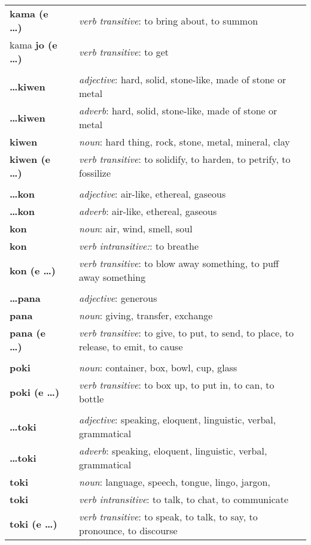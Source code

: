 \begin{supertabular}{p{2,5cm}|ll}
\textbf{kama (e \dots)} && \textit{verb transitive}: to bring about, to summon \\ %
kama \textbf{jo (e \dots)} && \textit{verb transitive}: to get \\ %
 && \\ %
\textbf{\dots kiwen} && \textit{adjective}: hard, solid, stone-like, made of stone or metal \\ %
\textbf{\dots kiwen} && \textit{adverb}: hard, solid, stone-like, made of stone or metal \\ %
\textbf{kiwen} && \textit{noun}: hard thing, rock, stone, metal, mineral, clay \\ %
\textbf{kiwen (e \dots)} && \textit{verb transitive}: to solidify, to harden, to petrify, to fossilize \\ %
 && \\ %
\textbf{\dots kon} && \textit{adjective}: air-like, ethereal, gaseous \\ %
\textbf{\dots kon} && \textit{adverb}: air-like, ethereal, gaseous \\ %
\textbf{kon} && \textit{noun}: air, wind, smell, soul \\ %
\textbf{kon} && \textit{verb intransitive:}: to breathe \\ %
\textbf{kon (e \dots)} && \textit{verb transitive}: to blow away something, to puff away something \\ %
 && \\ %
\textbf{\dots pana} && \textit{adjective}: generous \\ %
\textbf{pana} && \textit{noun}: giving, transfer, exchange \\ %
\textbf{pana (e \dots)} && \textit{verb transitive}: to give, to put, to send, to place, to release, to emit, to cause \\ %
 && \\ %
\textbf{poki} && \textit{noun}: container, box, bowl, cup, glass \\ %
\textbf{poki (e \dots)} && \textit{verb transitive}: to box up, to put in, to can, to bottle \\ %
 && \\ %
\textbf{\dots toki} && \textit{adjective}: speaking, eloquent, linguistic, verbal, grammatical \\ %
\textbf{\dots toki} && \textit{adverb}: speaking, eloquent, linguistic, verbal, grammatical \\ %
\textbf{toki} && \textit{noun}: language, speech, tongue, lingo, jargon, \\ %
\textbf{toki} && \textit{verb intransitive}: to talk, to chat, to communicate \\ %
\textbf{toki (e \dots)} && \textit{verb transitive}: to speak, to talk, to say, to pronounce, to discourse \\ %
\end{supertabular} \\
